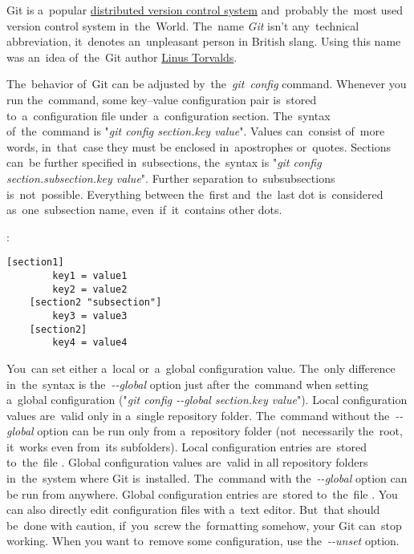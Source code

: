 \label{git}
Git is a~popular \hyperref[distributedversioncontrolsystem]{distributed version control system} and~probably the~most used version control system in~the~World. The~name \textit{Git} isn't any~technical abbreviation, it~denotes an~unpleasant person in British slang. Using this name was an~idea of~the~Git author \href{https://en.wikipedia.org/wiki/Linus_Torvalds}{Linus Torvalds}.

The~behavior of~Git can be adjusted by~the~\textit{git~config} command. Whenever you run the~command, some key--value configuration pair is~stored to~a~configuration file under~a~configuration section. The~syntax of~the~command is "\textit{git config section.key value}". Values can~consist of~more words, in~that~case they must be enclosed in~apostrophes or~quotes. Sections can~be further specified in~subsections, the~syntax is "\textit{git config section.subsection.key value}". Further separation to~subsubsections is~not~possible. Everything between the~first and~the~last dot is~considered as~one~subsection name, even~if~it~contains other dots.

:
\begin{lstlisting}[frame=no]
    [section1]
        key1 = value1
        key2 = value2
    [section2 "subsection"]
        key3 = value3
    [section2]
        key4 = value4
\end{lstlisting}

\noindent  You~can set either a~local or~a~global configuration value. The~only difference in~the~syntax is the~\textit{-{}-global} option just after the~command when setting a~global configuration ("\textit{git config -{}-global section.key value}"). Local configuration values are~valid only in a~single repository folder. The~command without the~\textit{-{}-global} option can be run only from a~repository folder (not~necessarily the~root, it~works even from~its subfolders). Local configuration entries are~stored to~the~file . Global configuration values are~valid in all repository folders in~the~system where Git is~installed. The~command with the~\textit{-{}-global} option can be run from anywhere. Global configuration entries are~stored to~the~file . You can also directly edit configuration files with a~text editor. But~that should be~done with caution, if~you~screw the~formatting somehow, your Git can~stop working. When you want to~remove some configuration, use the~\textit{-{}-unset} option.

